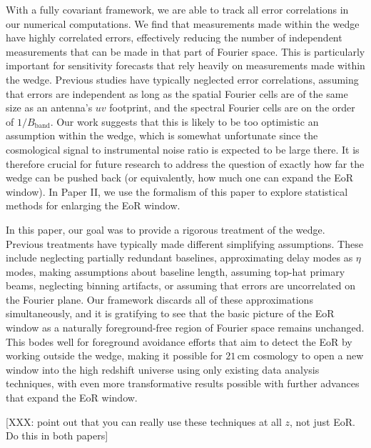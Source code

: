 \documentclass[twocolumn,aps,prd,nofootinbib,showpacs]{revtex4-1}
\begin{document}
With a fully covariant framework, we are able to track all error correlations in our numerical computations.  We find that measurements made within the wedge have highly correlated errors, effectively reducing the number of independent measurements that can be made in that part of Fourier space.  This is particularly important for sensitivity forecasts that rely heavily on measurements made within the wedge.  Previous studies have typically neglected error correlations, assuming that errors are independent as long as the spatial Fourier cells are of the same size as an antenna's $uv$ footprint, and the spectral Fourier cells are on the order of $1/ B_\textrm{band}$.  Our work suggests that this is likely to be too optimistic an assumption within the wedge, which is somewhat unfortunate since the cosmological signal to instrumental noise ratio is expected to be large there.  It is therefore crucial for future research to address the question of exactly how far the wedge can be pushed back (or equivalently, how much one can expand the EoR window).  In Paper II, we use the formalism of this paper to explore statistical methods for enlarging the EoR window.

In this paper, our goal was to provide a rigorous treatment of the wedge.  Previous treatments have typically made different simplifying assumptions.  These include neglecting partially redundant baselines, approximating delay modes as $\eta$ modes, making assumptions about baseline length, assuming top-hat primary beams, neglecting binning artifacts, or assuming that errors are uncorrelated on the Fourier plane.  Our framework discards all of these approximations simultaneously, and it is gratifying to see that the basic picture of the EoR window as a naturally foreground-free region of Fourier space remains unchanged.  This bodes well for foreground avoidance efforts that aim to detect the EoR by working outside the wedge, making it possible for $21\,\textrm{cm}$ cosmology to open a new window into the high redshift universe using only existing data analysis techniques, with even more transformative results possible with further advances that expand the EoR window.

[XXX: point out that you can really use these techniques at all $z$, not just EoR.  Do this in both papers]
\end{document}
